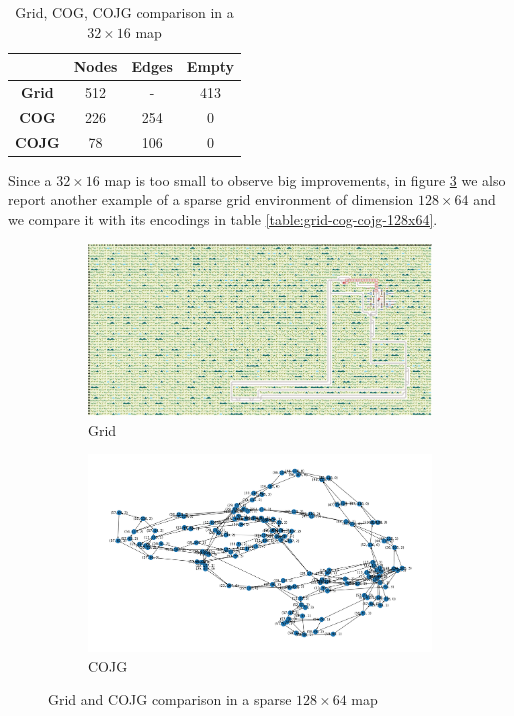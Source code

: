 \documentclass[a4paper,10pt]{report}
\begin{document}
\begin{table}[h]
	\center
	\begin{tabular}{||c c c c||}
		\hline
		              & \textbf{Nodes} & \textbf{Edges} & \textbf{Empty} \\ [0.5ex]
		\hline\hline
		\textbf{Grid} & 512            & -              & \num{413}      \\
		\hline
		\textbf{COG}  & 226            & 254            & 0              \\
		\hline
		\textbf{COJG} & 78             & 106            & 0              \\
		\hline
	\end{tabular}
	\caption{Grid, COG, COJG comparison in a $32\times 16$ map}
	\label{table:grid-cog-cojg-32x16}
\end{table}

Since a $32\times 16$ map is too small to observe big improvements, in figure \ref{fig:grid-cog-cojg-128x64} we also report another example of a sparse grid environment of dimension $128\times64$ and we compare it with its encodings in table \ref{table:grid-cog-cojg-128x64}.

\begin{figure}[!h]
	\begin{subfigure}[b]{\linewidth}
		\includegraphics[width=\textwidth]{grid-env-128x64.png}
		\caption{Grid}
		\label{fig:grid-env-128x64}
	\end{subfigure}%

	\begin{subfigure}[b]{\linewidth}
		\includegraphics[width=\textwidth]{cojg-env-128x64.png}
		\caption{COJG}
		\label{fig:cojg-env-128x64}
	\end{subfigure}%

	\caption{Grid and COJG comparison in a sparse $128\times64$ map}
	\label{fig:grid-cog-cojg-128x64}
\end{figure}
\end{document}
